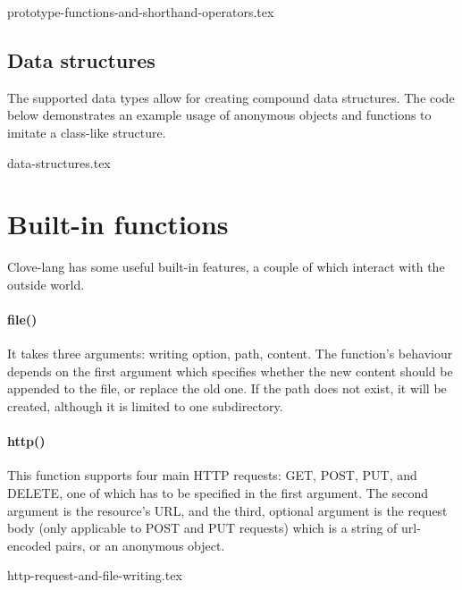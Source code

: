 \documentclass[12pt,a4paper]{article}
\begin{document}
{prototype-functions-and-shorthand-operators.tex}



\subsection*{Data structures}
The supported data types allow for creating compound data structures. The code below demonstrates an example usage of anonymous objects and functions to imitate a class-like structure.

{data-structures.tex}









\section*{Built-in functions}
Clove-lang has some useful built-in features, a couple of which interact with the outside world.

\paragraph*{file()}
It takes three arguments: writing option, path, content. The function's behaviour depends on the first argument which specifies whether the new content should be appended to the file, or replace the old one. If the path does not exist, it will be created, although it is limited to one subdirectory.

\paragraph*{http()}
This function supports four main HTTP requests: GET, POST, PUT, and DELETE, one of which has to be specified in the first argument. The second argument is the resource's URL, and the third, optional argument is the request body (only applicable to POST and PUT requests) which is a string of url-encoded pairs, or an anonymous object.

{http-request-and-file-writing.tex}
\end{document}

